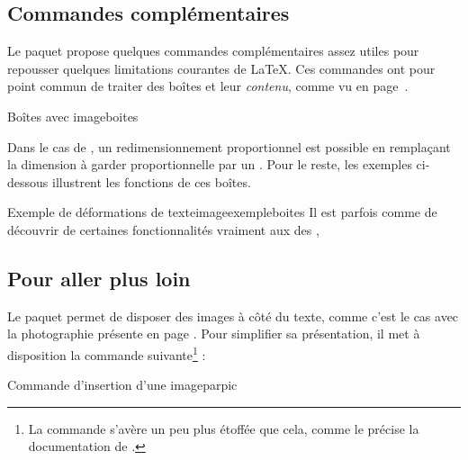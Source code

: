 \subsection{Commandes complémentaires}

Le paquet  propose quelques commandes complémentaires assez utiles pour repousser quelques limitations courantes de \LaTeX. Ces commandes ont pour point commun de traiter des boîtes et leur \emph{contenu}, comme vu en page~\pageref{boitestexte}.

\begin{codesimple}{Boîtes avec }{imageboites}
\end{codesimple}

Dans le cas de , un redimensionnement proportionnel est possible en remplaçant la dimension à garder proportionnelle par un \macron{\string!}. Pour le reste, les exemples ci-dessous illustrent les fonctions de ces boîtes. 

\begin{codedouble}{Exemple de déformations de texte}{imageexempleboites}
Il est parfois  comme  de découvrir
 de certaines fonctionnalités vraiment aux 
 des , 
\end{codedouble}

\subsection{Pour aller plus loin}

Le paquet  permet de disposer des images à côté du texte, comme c'est le cas avec la photographie présente en page \pageref{photoknuth}. Pour simplifier sa présentation, il met à disposition la  commande suivante\footnote{La  commande s'avère un peu plus étoffée que cela, comme le précise la documentation de .} :

\begin{codesimple}{Commande d'insertion d'une image}{parpic}
\parpic[§textit£encadrement¤}]{\texttt{[image: §textit£adresseimage¤]}}
\end{codesimple}

